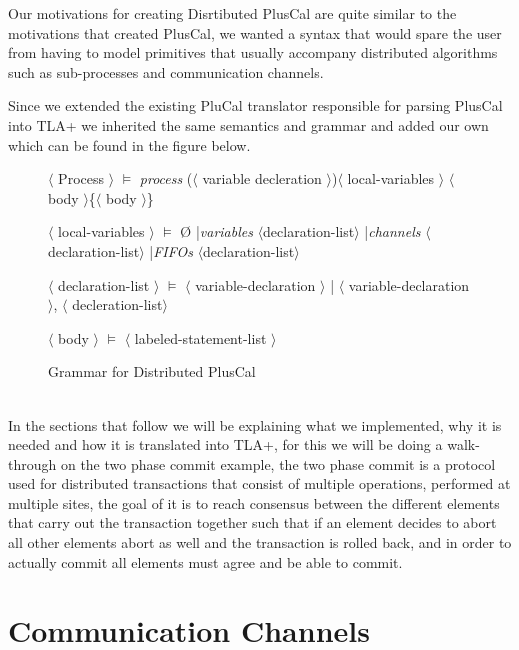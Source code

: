 \documentclass{thesul}
\begin{document}
Our motivations for creating Disrtibuted PlusCal are quite similar to the motivations that created PlusCal, we wanted a syntax that would spare the user from having to model primitives that usually accompany distributed algorithms such as sub-processes and communication channels.

Since we extended the existing PluCal translator responsible for parsing PlusCal into TLA+ we inherited the same semantics and grammar and added our own which can be found in the figure below.

\begin{figure}[!h]

$\langle$ Process $\rangle$ $\models$ \textit{process} ($\langle$ variable decleration $\rangle$)$\langle$ local-variables $\rangle$ 
$\langle$ body $\rangle$\{$\langle$ body $\rangle$\}

$\langle$ local-variables $\rangle$ $\models$ \O  
|\textit{variables} $\langle$declaration-list$\rangle$ 
|\textit{channels} $\langle$declaration-list$\rangle$ 
|\textit{FIFOs} $\langle$declaration-list$\rangle$ 

$\langle$ declaration-list $\rangle$ $\models$ 
$\langle$ variable-declaration $\rangle$ | 
$\langle$ variable-declaration $\rangle$, $\langle$ decleration-list$\rangle$

$\langle$ body $\rangle$ $\models$ 
$\langle$ labeled-statement-list $\rangle$

\caption{Grammar for Distributed PlusCal}

\end{figure}

\hfill\\
In the sections that follow we will be explaining what we implemented, why it is needed and how it is translated into TLA+, for this we will be doing a walk-through on the two phase commit example, the two phase commit is a protocol used for distributed transactions that consist of multiple operations, performed at multiple sites, the goal of it is to reach consensus between the different elements that carry out the transaction together such that if an element decides to abort all other elements abort as well and the transaction is rolled back, and in order to actually commit all elements must agree and be able to commit.

\section{Communication Channels}
\end{document}
